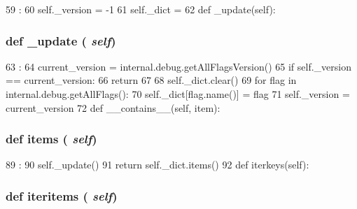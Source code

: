 \begin{DoxyCode}
59                       :
60         self._version = -1
61         self._dict = {}
62 
    def _update(self):
\end{DoxyCode}
\hypertarget{classm5_1_1debug_1_1AllFlags_a5186eac54b97bf19735a67d9652f424c}{
\subsubsection[{\_\-update}]{\setlength{\rightskip}{0pt plus 5cm}def \_\-update ( {\em self})}}
\label{classm5_1_1debug_1_1AllFlags_a5186eac54b97bf19735a67d9652f424c}



\begin{DoxyCode}
63                      :
64         current_version = internal.debug.getAllFlagsVersion()
65         if self._version == current_version:
66             return
67 
68         self._dict.clear()
69         for flag in internal.debug.getAllFlags():
70             self._dict[flag.name()] = flag
71         self._version = current_version
72 
    def __contains__(self, item):
\end{DoxyCode}
\hypertarget{classm5_1_1debug_1_1AllFlags_a717291221885735d6870d7179083ec07}{
\subsubsection[{items}]{\setlength{\rightskip}{0pt plus 5cm}def items ( {\em self})}}
\label{classm5_1_1debug_1_1AllFlags_a717291221885735d6870d7179083ec07}



\begin{DoxyCode}
89                    :
90         self._update()
91         return self._dict.items()
92 
    def iterkeys(self):
\end{DoxyCode}
\hypertarget{classm5_1_1debug_1_1AllFlags_a13d39839ad1cfd4c47f524735933c0bf}{
\subsubsection[{iteritems}]{\setlength{\rightskip}{0pt plus 5cm}def iteritems ( {\em self})}}
\label{classm5_1_1debug_1_1AllFlags_a13d39839ad1cfd4c47f524735933c0bf}



